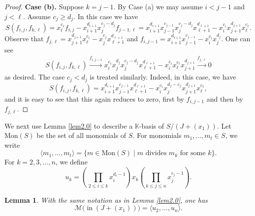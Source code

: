 \documentclass[12pt]{amsart}
\numberwithin{equation}{section}
\newtheorem{lemma}[theorem]{Lemma}
\theoremstyle{definition}
\newcommand{\init}{\ensuremath{\mathop{\mathrm{in}}}}
\newcommand{\F}{\mathbb{K}}
\begin{document}
\begin{proof}
\textbf{Case (b).} Suppose $k=j-1$.
By Case (a) we may assume $i<j-1$ and $j<\ell$.
Assume $c_j \geq d_j$.
In this case we have
\[
S(f_{i,j},f_{k,\ell})=x_\ell^{c_\ell}f_{i,j}
-x_{i+1}^{d_{i+1}}x_j^{c_j-d_j}f_{j-1,\ell}
=
x_{i+1}^{d_{i+1}}
x_{j-1}^{c_{j-1}}x_j^{c_j-d_j}x_{\ell+1}^{d_{\ell+1}}
-x_i^{c_i}x_{j+1}^{d_{j+1}}x_\ell^{c_\ell}.
\]
Observe that $f_{j,\ell}=x_{j+1}^{d_{j+1}}x_\ell^{c_\ell}
-x_j^{c_j}x_{\ell+1}^{d_{\ell+1}}$
and
$f_{i,j-1}
=x_{i+1}^{d_{i+1}}x_{j-1}^{c_{j-1}}
-x_i^{c_i}x_j^{d_j}$.
One can see
\begin{align*}
S(f_{i,j},f_{k,\ell})
\stackrel{f_{i,j-1}}\longrightarrow
x_i^{c_i}x_j^{d_j}x_j^{c_j-d_j}
x_{\ell+1}^{d_{\ell+1}}
-x_i^{c_i}x_\ell^{c_\ell}x_{j+1}^{d_{j+1}}
\stackrel{f_{j,\ell}}\longrightarrow 0
\end{align*}
as desired.
The case $c_j <d_j$ is treated similarly. Indeed, in this case, we have
\[
S(f_{i,j},f_{k,\ell})
=x_{i+1}^{d_{i+1}}x_{j-1}^{c_{j-1}}x_{\ell+1}^{d_{\ell+1}}
-x_i^{c_i}x_j^{d_j-c_j}x_{j+1}^{d_{j+1}}x_\ell^{c_\ell},
\]
and it is easy to see that this again reduces to zero, first by $f_{i,j-1}$ and then by $f_{j,\ell}$.
\end{proof} 

We next use Lemma \ref{lem2.0} to describe a $\F$-basis of
$S/(J+(x_1))$.
Let $\mathrm{Mon}(S)$ be the set of all monomials of $S$.
For monomials $m_1,\dots,m_t \in S$,
we write 
\[\langle m_1,\dots,m_t \rangle
=\{ m \in \mathrm{Mon}(S) \mid m \mbox{ divides } m_k \mbox{ for some }k\}.
\]
For $k=2,3,\dots,n$, we define
\[
u_k=\left( \prod_{2 \leq i \leq k} x_i^{d_i-1} \right) x_k \left( \prod_{k \leq j \leq n} x_j^{c_j-1} \right).
\]

\begin{lemma}
    \label{lem2.1}
    With the same notation as in Lemma \ref{lem2.0}, one has
    \[\mathcal M\big(\init(J+(x_1))\big)= \langle u_2,\dots,u_n\rangle.\]
\end{lemma}
\end{document}
